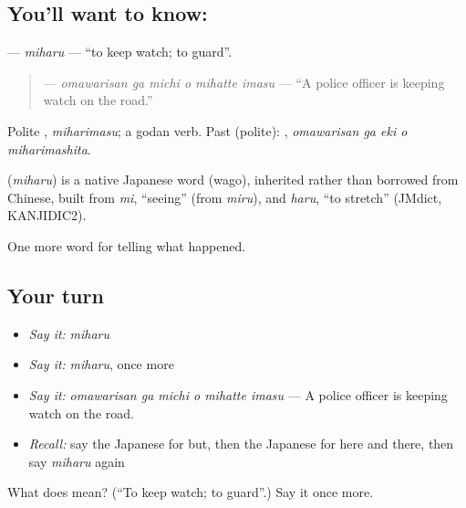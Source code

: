\subsection*{You'll want to know: }
\textbf{} — \emph{miharu} — \textquotedblleft{}to keep watch; to guard\textquotedblright{}.

\begin{quote}
\textbf{  } — \emph{omawarisan ga michi o mihatte imasu} — \textquotedblleft{}A police officer is keeping watch on the road.\textquotedblright{}
\end{quote}

Polite \textbf{}, \emph{miharimasu}; a godan verb. Past (polite): \textbf{  }, \emph{omawarisan ga eki o miharimashita}.

\begin{cousinweb}
\textbf{} (\emph{miharu}) is a native Japanese word (wago), inherited rather than borrowed from Chinese, built from \emph{mi}, \textquotedblleft{}seeing\textquotedblright{} (from \emph{miru}), and \emph{haru}, \textquotedblleft{}to stretch\textquotedblright{} (JMdict, KANJIDIC2).
\end{cousinweb}

\begin{grammarlens}[title={What you've built}]
One more word for telling what happened.
\end{grammarlens}

\subsection*{Your turn}
\begin{itemize}
\raggedright
  \item \emph{Say it:} \emph{miharu}
  \item \emph{Say it:} \emph{miharu}, once more
  \item \emph{Say it:} \emph{omawarisan ga michi o mihatte imasu} — A police officer is keeping watch on the road.
  \item \emph{Recall:} say the Japanese for but, then the Japanese for here and there, then say \emph{miharu} again
\end{itemize}

\begin{tcolorbox}[breakable,colback=teal!4,colframe=teal!35!black,title={Before you move on}]
What does  mean? (\textquotedblleft{}To keep watch; to guard\textquotedblright{}.) Say it once more.
\end{tcolorbox}
